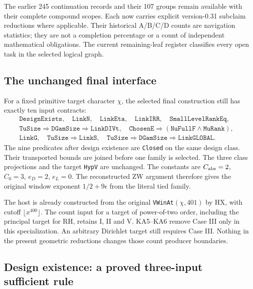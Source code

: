 The earlier 245 continuation records and their 107 groups remain
available with their complete compound scopes. Each now carries
explicit version-0.31 subclaim reductions where applicable.
Their historical A/B/C/D counts are navigation statistics; they are
not a completion percentage or a count of independent mathematical
obligations. The current remaining-leaf register classifies every
open task in the selected logical graph.

\subsection{The unchanged final interface}

For a fixed primitive target character $\chi$, the selected final
construction still has exactly ten input contracts:
\[
\begin{gathered}
\texttt{DesignExists},\quad
\texttt{LinkN},\quad\texttt{LinkEta},\quad\texttt{LinkIRR},\quad
\texttt{SmallLevelRankEq},\\
\texttt{TuSize}\Rightarrow\texttt{DGamSize}\Rightarrow\texttt{LinkDIVt},
\quad
\texttt{ChosenE}\Rightarrow(\texttt{NuFullF}\wedge\texttt{MuRank}),\\
\texttt{LinkG},\quad
\texttt{TuSize}\Rightarrow\texttt{LinkS},\quad
\texttt{TuSize}\Rightarrow\texttt{DGamSize}\Rightarrow\texttt{LinkGLOBAL}.
\end{gathered}                                                   \tag{AU31.1}
\]
The nine predicates after design existence are \texttt{Closed} on
the same design class. Their transported bounds are joined before
one family is selected. The three class projections and the target
\texttt{HypV} are unchanged. The constants are
$C_{\rm abs}=2$, $C_0=3$, $e_D=2$, $e_L=0$.
The reconstructed ZW argument therefore gives the original window
exponent $1/2+9\epsilon$ from the literal tied family.

The host is already constructed from the original
\texttt{VWinAt}$(\chi,401)$ by HX, with cutoff
$\lfloor x^{400}\rfloor$. The count input for a target of
power-of-two order, including the principal target for RH, retains
I, II and V. KA5--KA6 remove Case III only in this specialization.
An arbitrary Dirichlet target still requires Case III.
Nothing in the present geometric reductions changes those count
producer boundaries.

\subsection{Design existence: a proved three-input sufficient rule}

